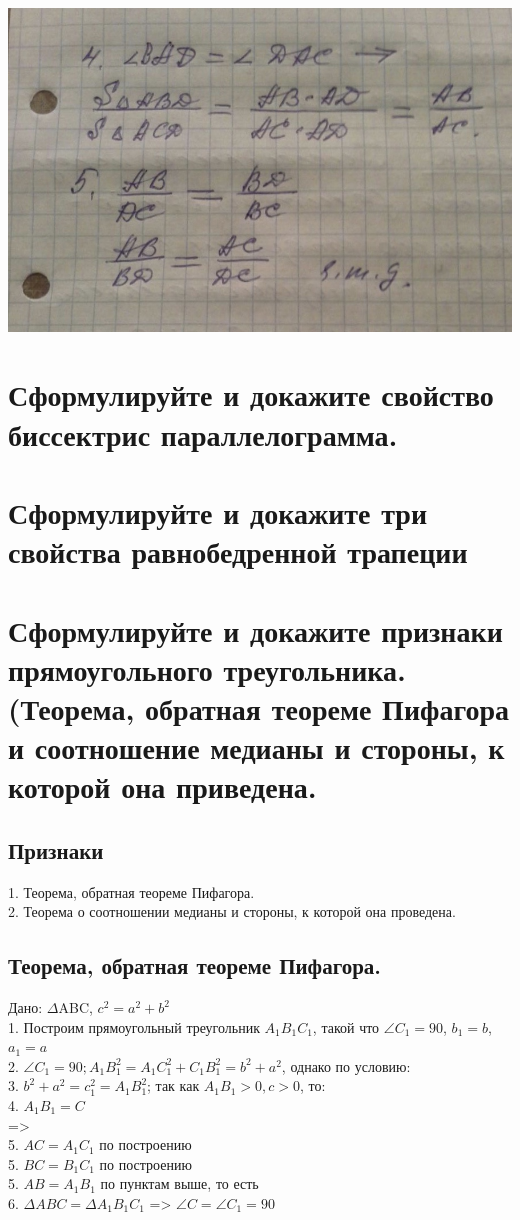 \documentclass[12pt, letterpaper]{article}
\begin{document}
\includegraphics[scale=0.3]{solve14-1.jpg} \\
\section {Сформулируйте и докажите свойство биссектрис параллелограмма.}
\section {Сформулируйте и докажите три свойства равнобедренной трапеции}
\section {Сформулируйте и докажите признаки прямоугольного треугольника. (Теорема, обратная теореме Пифагора и соотношение медианы и стороны, к которой она приведена.}
\subsection{Признаки}
1. Теорема, обратная теореме Пифагора. \\
2. Теорема о соотношении медианы и стороны, к которой она проведена. \\

\subsection{Теорема, обратная теореме Пифагора.}
Дано: $\Delta$ABC, $c^2=a^2+b^2$ \\
1. Построим прямоугольный треугольник $A_1 B_1 C_1$, такой что $\angle C_1 = 90 $, $b_1=b$, $a_1=a$ \\
2. $\angle C_1=90; A_1 B_1^2 = A_1 C_1^2+C_1 B_1^2 = b^2+a^2$, однако по условию:\\
3. $b^2+a^2=c_1^2 = A_1 B_1^2$; так как $A_1 B_1>0, c>0$, то: \\
4. $A_1 B_1 = C$ \\
=> \\
5. $AC = A_1 C_1 $ по построению \\
5. $BC = B_1 C_1 $ по построению \\
5. $AB = A_1 B_1 $ по пунктам выше, то есть \\
6. $\Delta ABC = \Delta A_1 B_1 C_1 $ => $\angle C = \angle C_1 = 90 $ \\
\end{document}
